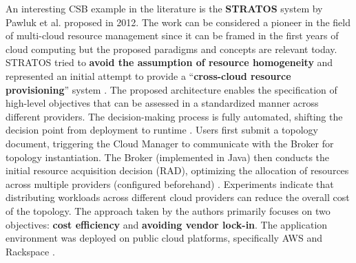 An interesting CSB example in the literature is the \textbf{STRATOS} system by Pawluk et al. proposed in 2012. The work can be considered a pioneer in the field of multi-cloud resource management since it can be framed in the first years of cloud computing \cite{STRATOS} but the proposed paradigms and concepts are relevant today.
STRATOS tried to \textbf{avoid the assumption of resource homogeneity} and represented an initial attempt to provide a ``\textbf{cross-cloud resource provisioning}'' system \cite{STRATOS}.
The proposed architecture enables the specification of high-level objectives that can be assessed in a standardized manner across different providers. The decision-making process is fully automated, shifting the decision point from deployment to runtime \cite{STRATOS}.
Users first submit a topology document, triggering the Cloud Manager to communicate with the Broker for topology instantiation. The Broker (implemented in Java) then conducts the initial resource acquisition decision (RAD), optimizing the allocation of resources across multiple providers (configured beforehand) \cite{STRATOS}.
Experiments indicate that distributing workloads across different cloud providers can reduce the overall cost of the topology. The approach taken by the authors primarily focuses on two objectives: \textbf{cost efficiency} and \textbf{avoiding vendor lock-in}. The application environment was deployed on public cloud platforms, specifically AWS and Rackspace \cite{STRATOS}.
\newline

